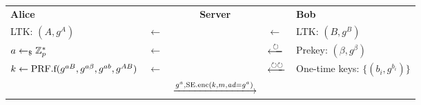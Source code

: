 \begin{tabular}{lC{2cm}cC{2cm}l}
\textbf{Alice} & & \textbf{Server} & & \textbf{Bob}\\
LTK: $(A, g^A)$ & $\longleftarrow$ & & $\longleftarrow$ & LTK: $(B, g^B)$\\
$a\gets_\$\mathbb{Z}_p^*$ & $\longleftarrow$ & & $\xlongleftarrow{\circlearrowright}$ & Prekey: $(\beta, g^\beta)$\\
$k\gets\mathrm{PRF}.\mathrm{f}(g^{aB}, g^{a\beta}, g^{ab}, g^{AB})$ & $\longleftarrow$ & & $\xlongleftarrow{\circlearrowright\circlearrowright}$ & One-time keys: $\{(b_i, g^{b_i})\}$\\
& & $\xlongrightarrow{g^a, \SYEenc(k, m, \ad=g^a)}$ & &
\end{tabular}